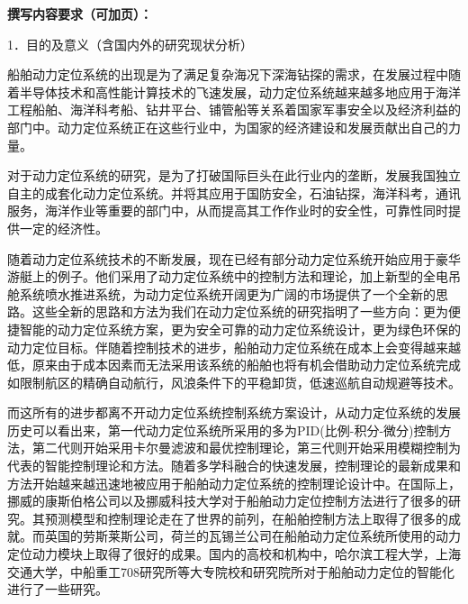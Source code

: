 \documentclass[a4paper]{ctexart}
\begin{document}
\begin{mdframed}
{\large \textbf{\fangsong 撰写内容要求（可加页）：}}

{\large \fangsong 
\begin{flushleft}
1．目的及意义（含国内外的研究现状分析）
\end{flushleft}

   船舶动力定位系统的出现是为了满足复杂海况下深海钻探的需求，在发展过程中随着半导体技术和高性能计算技术的飞速发展，动力定位系统越来越多地应用于海洋工程船舶、海洋科考船、钻井平台、铺管船等关系着国家军事安全以及经济利益的部门中。动力定位系统正在这些行业中，为国家的经济建设和发展贡献出自己的力量。
   
对于动力定位系统的研究，是为了打破国际巨头在此行业内的垄断，发展我国独立自主的成套化动力定位系统。并将其应用于国防安全，石油钻探，海洋科考，通讯服务，海洋作业等重要的部门中，从而提高其工作作业时的安全性，可靠性同时提供一定的经济性。

随着动力定位系统技术的不断发展，现在已经有部分动力定位系统开始应用于豪华游艇上的例子。他们采用了动力定位系统中的控制方法和理论，加上新型的全电吊舱系统喷水推进系统，为动力定位系统开阔更为广阔的市场提供了一个全新的思路。这些全新的思路和方法为我们在动力定位系统的研究指明了一些方向：更为便捷智能的动力定位系统方案，更为安全可靠的动力定位系统设计，更为绿色环保的动力定位目标。伴随着控制技术的进步，船舶动力定位系统在成本上会变得越来越低，原来由于成本因素而无法采用该系统的船舶也将有机会借助动力定位系统完成如限制航区的精确自动航行，风浪条件下的平稳卸货，低速巡航自动规避等技术。

而这所有的进步都离不开动力定位系统控制系统方案设计，从动力定位系统的发展历史可以看出来，第一代动力定位系统所采用的多为PID(比例-积分-微分)控制方法，第二代则开始采用卡尔曼滤波和最优控制理论，第三代则开始采用模糊控制为代表的智能控制理论和方法。随着多学科融合的快速发展，控制理论的最新成果和方法开始越来越迅速地被应用于船舶动力定位系统的控制理论设计中。在国际上，挪威的康斯伯格公司以及挪威科技大学对于船舶动力定位控制方法进行了很多的研究。其预测模型和控制理论走在了世界的前列，在船舶控制方法上取得了很多的成就。而英国的劳斯莱斯公司，荷兰的瓦锡兰公司在船舶动力定位系统所使用的动力定位动力模块上取得了很好的成果。国内的高校和机构中，哈尔滨工程大学，上海交通大学，中船重工708研究所等大专院校和研究院所对于船舶动力定位的智能化进行了一些研究。

}
\end{mdframed}
\end{document}
